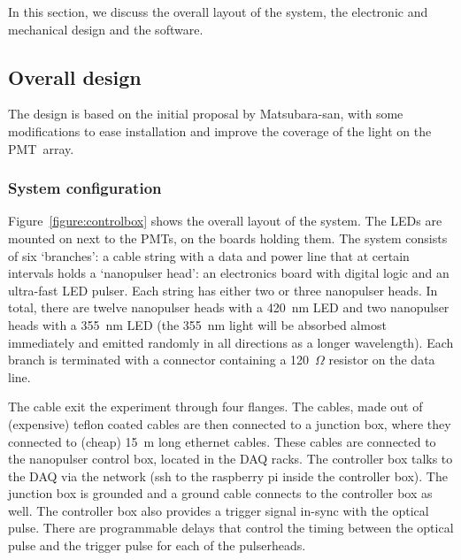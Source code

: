 

In this section, we discuss the overall layout of the system, the electronic and mechanical design and the software.


\subsection*{Overall design}

The design is based on the initial proposal by Matsubara-san, with some modifications to ease installation and improve the coverage of the light on the PMT~array.

\subsubsection*{System configuration}
%
%

Figure~\ref{figure:controlbox} shows the overall layout of the system. The LEDs are mounted on next to the PMTs, on the boards holding them. The system consists of six `branches': a cable string with a data and power line that at certain intervals holds a `nanopulser head': an electronics board with digital logic and an ultra-fast LED pulser. Each string has either two or three nanopulser heads. In total, there are twelve nanopulser heads with a 420~nm LED and two nanopulser heads with a 355~nm LED (the 355~nm light will be absorbed almost immediately and emitted randomly in all directions as a longer wavelength). Each branch is terminated with a connector containing a 120~$\Omega$ resistor on the data line. 

The cable exit the experiment through four flanges. The cables, made out of (expensive) teflon coated cables are then connected to a junction box, where they connected to (cheap) 15~m long ethernet cables. These cables are connected to the nanopulser control box, located in the DAQ racks. The controller box talks to the DAQ via the network (ssh to the raspberry pi inside the controller box). The junction box is grounded and a ground cable connects to the controller box as well. The controller box also provides a trigger signal in-sync with the optical pulse. There are programmable delays that control the timing between the optical pulse and the trigger pulse for each of the pulserheads. 

